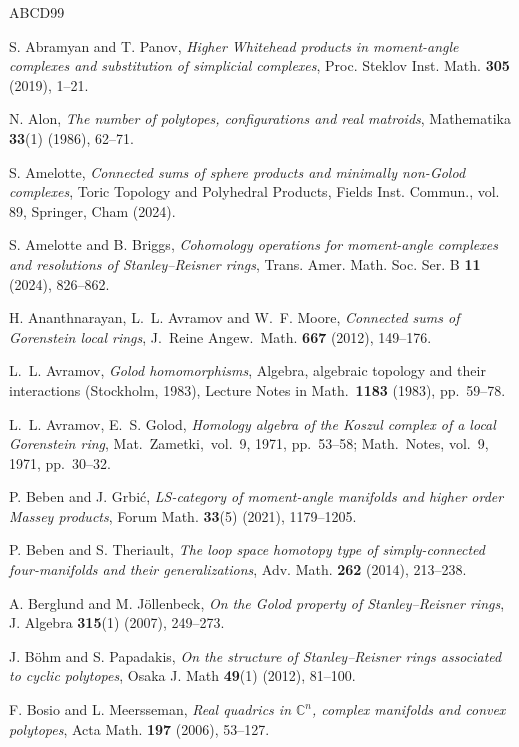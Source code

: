 \documentclass[a4paper,10pt]{amsart}
\theoremstyle{definition}
\theoremstyle{remark}
\begin{document}
\begin{thebibliography}{ABCD99}

 S. Abramyan and T. Panov, \emph{Higher Whitehead products in moment-angle complexes and substitution of simplicial complexes}, Proc. Steklov Inst. Math. \textbf{305} (2019), 1--21.

 N. Alon, \emph{The number of polytopes, configurations and real matroids}, Mathematika \textbf{33}(1) (1986), 62--71.

 S. Amelotte, \emph{Connected sums of sphere products and minimally non-Golod complexes}, Toric Topology and Polyhedral Products, Fields Inst. Commun., vol. 89, Springer, Cham (2024).

 S. Amelotte and B. Briggs, \emph{Cohomology operations for moment-angle complexes and resolutions of Stanley--Reisner rings}, Trans. Amer. Math. Soc. Ser. B \textbf{11} (2024), 826--862.

 H. Ananthnarayan, L.~L. Avramov and W.~F. Moore, \emph{Connected sums of Gorenstein local rings}, J.\ Reine Angew.\ Math. {\bf 667} (2012), 149--176.

 L.~L. Avramov, \emph{Golod homomorphisms}, Algebra, algebraic topology and their interactions ({S}tockholm, 1983), Lecture Notes in Math.\ {\bf 1183} (1983), pp.\ 59--78.

 L.~L. Avramov, E.~S. Golod, \emph{Homology algebra of the Koszul complex of a local Gorenstein ring}, Mat.\ Zametki,\ vol.\ 9, 1971, pp.\ 53--58; Math.\ Notes, vol.\ 9, 1971, pp.\ 30--32.

 P. Beben and J. Grbi\'c, \emph{LS-category of moment-angle manifolds and higher order Massey products}, Forum Math. {\bf 33}(5) (2021), 1179--1205.

 P. Beben and S. Theriault, \emph{The loop space homotopy type of simply-connected four-manifolds and their generalizations}, Adv. Math. \textbf{262} (2014), 213--238. 

 A. Berglund and M. J\"ollenbeck, \emph{On the Golod property of Stanley--Reisner rings}, J. Algebra \textbf{315}(1) (2007), 249--273.

 J. B\"ohm and S. Papadakis, \emph{On the structure of Stanley--Reisner rings associated to cyclic polytopes}, Osaka J. Math \textbf{49}(1) (2012), 81--100.

 F. Bosio and L. Meersseman, \emph{Real quadrics in $\mathbb{C}^n$, complex manifolds and convex polytopes}, Acta Math. \textbf{197} (2006), 53--127.


\end{thebibliography}
\end{document}
